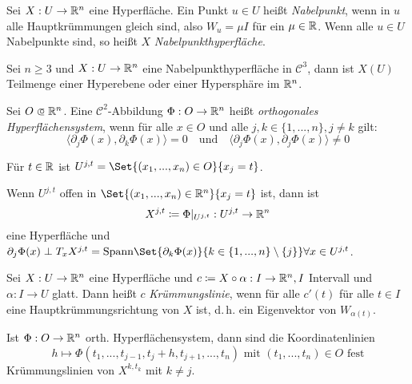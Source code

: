 \documentclass{cheat-sheet}
\newcommand\opn{\mathrel{\ooalign{$\subset$\cr
  \hidewidth\raise.1ex\hbox{$\circ\mkern.5mu$}\cr}}}
\begin{document}

\begin{defn}
  Sei $X : U \to \mathbb{R}^n$ eine Hyperfläche. Ein Punkt $u \in U$ heißt \emph{Nabelpunkt}, wenn in $u$ alle Hauptkrümmungen gleich sind, also $W_u = \mu I$ für ein $\mu \in \mathbb{R}$. Wenn alle $u \in U$ Nabelpunkte sind, so heißt $X$ \emph{Nabelpunkthyperfläche}.
\end{defn}

\begin{satz}
  Sei $n \geq 3$ und $X : U \to \mathbb{R}^n$ eine Nabelpunkthyperfläche in $\mathcal{C}^3$, dann ist $X(U)$ Teilmenge einer Hyperebene oder einer Hypersphäre im $\mathbb{R}^n$.
\end{satz}

\begin{defn}
  Sei $O \opn \R^n$. Eine $\mathcal{C}^2$-Abbildung $\Phi : O \to \mathbb{R}^n$ heißt \emph{orthogonales Hyperflächensystem}, wenn für alle $x \in O$ und alle $j, k \in \{ 1, ..., n \}, j \not= k$ gilt:
  \[
    \langle \partial_j \Phi(x), \partial_k \Phi(x) \rangle = 0
    \quad \text{und} \quad
    \langle \partial_j \Phi(x), \partial_j \Phi(x) \rangle \not= 0
  \]
\end{defn}

\begin{nota}
  Für $t \in \mathbb{R}$ ist $U^{j,t} = \Set{ (x_1, ..., x_n) \in O }{ x_j = t }$.
\end{nota}

\begin{bem}
  Wenn $U^{j,t}$ offen in $\Set{ (x_1, ..., x_n) \in \R^n }{ x_j = t }$ ist, dann ist
  \[ X^{j,t} \coloneqq \Phi|_{U^{j,t}} : U^{j,t} \to \mathbb{R}^n \]
  eine Hyperfläche und $\partial_j \Phi(x) \perp T_x X^{j,t} = \mathrm{Spann} \Set{ \partial_k \Phi(x) }{ k \in \{ 1, ..., n \} \setminus \{ j \} } \forall x \in U^{j,t}$.
\end{bem}

\begin{defn}
  Sei $X : U \to \mathbb{R}^n$ eine Hyperfläche und $c \coloneqq X \circ \alpha : I \to \mathbb{R}^n, I$ Intervall und $\alpha : I \to U$ glatt. Dann heißt $c$ \emph{Krümmungslinie}, wenn für alle $c'(t)$ für alle $t \in I$ eine Hauptkrümmungsrichtung von $X$ ist, d.\,h. ein Eigenvektor von $W_{\alpha(t)}$.
\end{defn}

\begin{satz}
  Ist $\Phi : O \to \mathbb{R}^n$ orth. Hyperflächensystem, dann sind die Koordinatenlinien
  \[ h \mapsto \Phi(t_1, ..., t_{j-1}, t_j + h, t_{j+1}, ..., t_n) \text{ mit } (t_1, ..., t_n) \in O \text{ fest} \]
  Krümmungslinien von $X^{k, t_k}$ mit $k \not= j$.
\end{satz}
\end{document}
